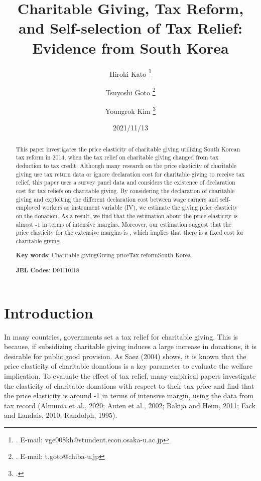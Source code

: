 \documentclass[
  11pt,
  a4paper,
]{article}
\title{Charitable Giving, Tax Reform, and Self-selection of Tax Relief: Evidence from South Korea  }
\author{
    Hiroki Kato
  \thanks{. E-mail: vge008kh@stundent.econ.osaka-u.ac.jp  }
  \and
    Tsuyoshi Goto
  \thanks{. E-mail: t.goto@chiba-u.jp  }
  \and
    Youngrok Kim
  \thanks{.  }
  \and
  }
\date{2021/11/13}
\begin{document}
\begin{spacing}{1}
  \maketitle
\end{spacing}
\begin{spacing}{1}
  \begin{abstract}
    This paper investigates the price elasticity of charitable giving utilizing South Korean tax reform in 2014, when the tax relief on charitable giving changed from tax deduction to tax credit. Although many research on the price elasticity of charitable giving use tax return data or ignore declaration cost for charitable giving to receive tax relief, this paper uses a survey panel data and considers the existence of declaration cost for tax reliefs on charitable giving.
    By considering the declaration of charitable giving and exploiting the different declaration cost between wage earners and self-employed workers as instrument variable (IV), we estimate the giving price elasticity on the donation. As a result, we find that the estimation about the price elasticity is almost -1 in terms of intensive margins.
    Moreover, our estimation suggest that the price elasticity for the extensive margins is , which implies that there is a fixed cost for charitable giving.
    
            \noindent
    \textbf{Key words}: Charitable givingGiving priceTax reformSouth Korea
        
        \noindent
    \textbf{JEL Codes}: D91I10I18
        
  \end{abstract}
\end{spacing}

\hypertarget{introduction}{%
\section{Introduction}\label{introduction}}

In many countries, governments set a tax relief for charitable giving. This is because, if subsidizing charitable giving induces a large increase in donations, it is desirable for public good provision. As Saez (2004) shows, it is known that the price elasticity of charitable donations is a key parameter to evaluate the welfare implication. To evaluate the effect of tax relief, many empirical papers investigate the elasticity of charitable donations with respect to their tax price and find that the price elasticity is around -1 in terms of intensive margin, using the data from tax record (Almunia et al., 2020; Auten et al., 2002; Bakija and Heim, 2011; Fack and Landais, 2010; Randolph, 1995).
\end{document}
